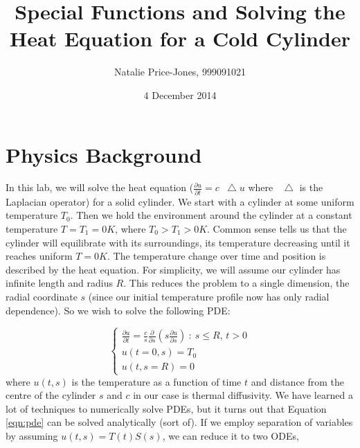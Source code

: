 \documentclass[a4paper,12pt]{article}
\newcommand*\lap{\mathop{}\!\mathbin\bigtriangleup}
\begin{document}
\onehalfspacing
\title{Special Functions and Solving the Heat Equation for a Cold Cylinder}
\author{Natalie Price-Jones, 999091021}
\date{4 December 2014}
\maketitle

\section{Physics Background}
%

In this lab, we will solve the heat equation ($\frac{\partial u}{\partial t} = c\lap u$ where $\lap$ is the Laplacian operator) for a solid cylinder. We start with a cylinder at some uniform temperature $T_0$. Then we hold the environment around the cylinder at a constant temperature $T = T_1 = 0 K$, where $T_0 > T_1 > 0K$. Common sense tells us that the cylinder will equilibrate with its surroundings, its temperature decreasing until it reaches uniform $T = 0K$. The temperature change over time and position is described by the heat equation. For simplicity, we will assume our cylinder has infinite length and radius $R$. This reduces the problem to a single dimension, the radial coordinate $s$ (since our initial temperature profile now has only radial dependence). So we wish to solve the following PDE:

\begin{displaymath}
   \left\{
   	\begin{equation}
     \begin{array}{c}
     \frac{\partial u}{\partial t} = \frac{c}{s}\frac{\partial}{\partial s}\left(s\frac{\partial u}{\partial s}\right)\: : \: s \leq R,\, t > 0\\
     u(t = 0, s)  = T_0\\
     u(t,s = R) = 0
     \end{array}
     \label{eqn:pde}
     \end{equation}
   \right.
\end{displaymath} 
%
where $u(t,s)$ is the temperature as a function of time $t$ and distance from the centre of the cylinder $s$ and $c$ in our case is thermal diffusivity. We have learned a lot of techniques to numerically solve PDEs, but it turns out that Equation \ref{eqn:pde} can be solved analytically (sort of). If we employ separation of variables by assuming $u(t,s) = T(t)S(s)$, we can reduce it to two ODEs,
\end{document}
